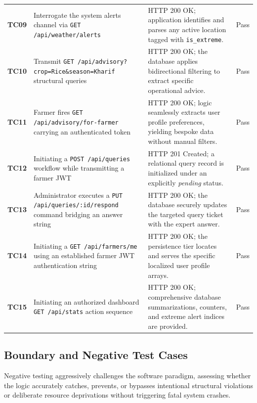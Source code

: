 \begin{longtable}{>{\bfseries}p{} p{} p{} p{}}
\addlinespace
TC09 & Interrogate the system alerts channel via \texttt{GET /api/weather/alerts} & HTTP 200 OK; application identifies and parses any active location tagged with \texttt{is\_extreme}. & Pass \\
\addlinespace
TC10 & Transmit \texttt{GET /api/advisory?crop=Rice\&season=Kharif} structural queries & HTTP 200 OK; the database applies bidirectional filtering to extract specific operational advice. & Pass \\
\addlinespace
TC11 & Farmer fires \texttt{GET /api/advisory/for-farmer} carrying an authenticated token & HTTP 200 OK; logic seamlessly extracts user profile preferences, yielding bespoke data without manual filters. & Pass \\
\addlinespace
TC12 & Initiating a \texttt{POST /api/queries} workflow while transmitting a farmer JWT & HTTP 201 Created; a relational query record is initialized under an explicitly \textit{pending} status. & Pass \\
\addlinespace
TC13 & Administrator executes a \texttt{PUT /api/queries/:id/respond} command bridging an answer string & HTTP 200 OK; the database securely updates the targeted query ticket with the expert answer. & Pass \\
\addlinespace
TC14 & Initiating a \texttt{GET /api/farmers/me} using an established farmer JWT authentication string & HTTP 200 OK; the persistence tier locates and serves the specific localized user profile arrays. & Pass \\
\addlinespace
TC15 & Initiating an authorized dashboard \texttt{GET /api/stats} action sequence & HTTP 200 OK; comprehensive database summarizations, counters, and extreme alert indices are provided. & Pass \\

\end{longtable}\endgroup

\subsection{Boundary and Negative Test Cases}
Negative testing aggressively challenges the software paradigm, assessing whether the logic accurately catches, prevents, or bypasses intentional structural violations or deliberate resource deprivations without triggering fatal system crashes.

